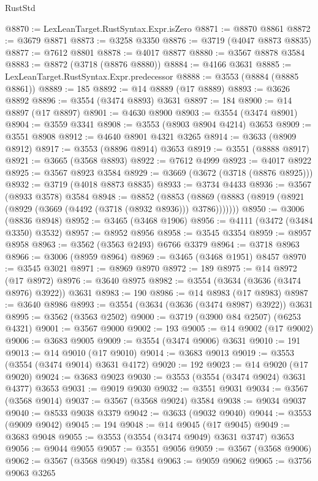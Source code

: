 \begin{lexlean}{RustStd}
\begin{coremodule}
@8870 := LexLeanTarget.RustSyntax.Expr.isZero
@8871 := @8870 @8861
@8872 := @3679 @8871
@8873 := @3258 @3350
@8876 := @3719 (@4047 @8873 @8835)
@8877 := @7612 @8801
@8878 := @4017 @8877
@8880 := @3567 @8878 @3584
@8883 := @8872 (@3718 (@8876 @8880))
@8884 := @4166 @3631
@8885 := LexLeanTarget.RustSyntax.Expr.predecessor
@8888 := @3553 (@8884 (@8885 @8861))
@8889 := 185
@8892 := @14 @8889 (@17 @8889)
@8893 := @3626 @8892
@8896 := @3554 (@3474 @8893) @3631
@8897 := 184
@8900 := @14 @8897 (@17 @8897)
@8901 := @4630 @8900
@8903 := @3554 (@3474 @8901)
@8904 := @3559 @3341
@8908 := @3553 (@8903 @8904 @4214) @3653
@8909 := @3551 @8908
@8912 := @4640 @8901 @4321 @3265
@8914 := @3633 (@8909 @8912)
@8917 := @3553 (@8896 @8914) @3653
@8919 := @3551 (@8888 @8917)
@8921 := @3665 (@3568 @8893)
@8922 := @7612 @4999
@8923 := @4017 @8922
@8925 := @3567 @8923 @3584
@8929 := @3669 (@3672 (@3718 (@8876 @8925)))
@8932 := @3719 (@4018 @8873 @8835)
@8933 := @3734 @4433
@8936 := @3567 (@8933 @3578) @3584
@8948 := @8852
    (@8853 (@8869 (@8883 (@8919 (@8921 (@8929 (@3669 (@4492 (@3718 (@8932 @8936))) @3786)))))))
@8950 := @3006 (@8836 @8948)
@8952 := @3465 (@3468 @1906)
@8956 := @4111 (@3472 (@3484 @3350) @3532)
@8957 := @8952 @8956
@8958 := @3545 @3354
@8959 := @8957 @8958
@8963 := @3562 (@3563 @2493) @6766 @3379
@8964 := @3718 @8963
@8966 := @3006 (@8959 @8964)
@8969 := @3465 (@3468 @1951) @8457
@8970 := @3545 @3021
@8971 := @8969 @8970
@8972 := 189
@8975 := @14 @8972 (@17 @8972)
@8976 := @3640 @8975
@8982 := @3554 (@3634 (@3636 (@3474 @8976) @3922)) @3631
@8983 := 190
@8986 := @14 @8983 (@17 @8983)
@8987 := @3640 @8986
@8993 := @3554 (@3634 (@3636 (@3474 @8987) @3922)) @3631
@8995 := @3562 (@3563 @2502)
@9000 := @3719 (@3900 @84 @2507) (@6253 @4321)
@9001 := @3567 @9000
@9002 := 193
@9005 := @14 @9002 (@17 @9002)
@9006 := @3683 @9005
@9009 := @3554 (@3474 @9006) @3631
@9010 := 191
@9013 := @14 @9010 (@17 @9010)
@9014 := @3683 @9013
@9019 := @3553 (@3554 (@3474 @9014) @3631 @4172)
@9020 := 192
@9023 := @14 @9020 (@17 @9020)
@9024 := @3683 @9023
@9030 := @3553 (@3554 (@3474 @9024) @3631 @4377) @3653
@9031 := @9019 @9030
@9032 := @3551 @9031
@9034 := @3567 (@3568 @9014)
@9037 := @3567 (@3568 @9024) @3584
@9038 := @9034 @9037
@9040 := @8533 @9038 @3379
@9042 := @3633 (@9032 @9040)
@9044 := @3553 (@9009 @9042)
@9045 := 194
@9048 := @14 @9045 (@17 @9045)
@9049 := @3683 @9048
@9055 := @3553 (@3554 (@3474 @9049) @3631 @3747) @3653
@9056 := @9044 @9055
@9057 := @3551 @9056
@9059 := @3567 (@3568 @9006)
@9062 := @3567 (@3568 @9049) @3584
@9063 := @9059 @9062
@9065 := @3756 @9063 @3265

\end{coremodule}
\end{lexlean}
